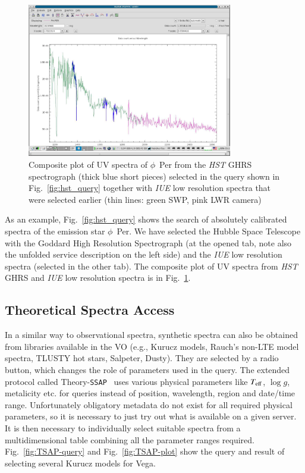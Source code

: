 \documentclass[final,authoryear,5p,times,twocolumn]{elsarticle}
\newcommand{\ssap}{\texttt{SSAP}}
\begin{document}
\begin{figure}[t]
\begin{center}
\includegraphics[width=0.8\textwidth]{iuehst2.pdf}
\caption{Composite plot of UV spectra of $\phi$~Per from the \emph{HST} GHRS
  spectrograph (thick blue short pieces) selected in the query shown in
  Fig.~\ref{fig:hst_query} together with \emph{IUE} low resolution spectra
  that were selected earlier (thin lines: green SWP, pink LWR camera)}
\label{fig:iuehst2}
\end{center}
\end{figure}

As an example, Fig.~\ref{fig:hst_query} shows the search of absolutely
calibrated spectra of the emission star $\phi$~Per. We have selected the
Hubble Space Telescope with the Goddard High Resolution Spectrograph (at the
opened tab, note also the unfolded service description on the left side) and
the \emph{IUE} low resolution spectra (selected in the other tab).  The
composite plot of UV spectra from \emph{HST} GHRS and \emph{IUE} low
resolution spectra is in Fig.~\ref{fig:iuehst2}.

\subsection{ Theoretical Spectra Access}

In a similar way to observational spectra, synthetic spectra can also be
obtained from libraries available in the VO (e.g., Kurucz models, Rauch's
non-LTE model spectra, TLUSTY hot stars, Salpeter, Dusty). They are selected
by a radio button, which changes the role of parameters used in the query. The
extended protocol called Theory-\ssap\ \citep[hereafter TSAP;][]{ssap} uses
various physical parameters like $T_{\rm eff}$, $\log g$, metalicity etc. for
queries instead of position, wavelength, region and date/time range.
Unfortunately obligatory metadata do not exist for all required physical
parameters, so it is necessary to just try out what is available on a given
server.  It is then necessary to individually select suitable spectra from a
multidimensional table combining all the parameter ranges required.
Fig.~\ref{fig:TSAP-query} and Fig.~\ref{fig:TSAP-plot} show the query and
result of selecting several Kurucz models for Vega.
\end{document}
